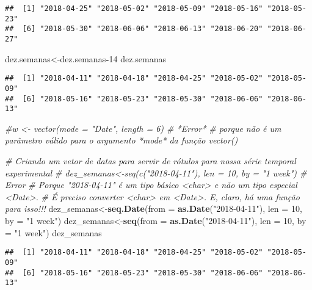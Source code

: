 \documentclass[]{article}
\newenvironment{Shaded}{\begin{snugshade}}{\end{snugshade}}
\newcommand{\KeywordTok}[1]{\textcolor[rgb]{0.13,0.29,0.53}{\textbf{#1}}}
\newcommand{\DataTypeTok}[1]{\textcolor[rgb]{0.13,0.29,0.53}{#1}}
\newcommand{\DecValTok}[1]{\textcolor[rgb]{0.00,0.00,0.81}{#1}}
\newcommand{\StringTok}[1]{\textcolor[rgb]{0.31,0.60,0.02}{#1}}
\newcommand{\CommentTok}[1]{\textcolor[rgb]{0.56,0.35,0.01}{\textit{#1}}}
\newcommand{\OperatorTok}[1]{\textcolor[rgb]{0.81,0.36,0.00}{\textbf{#1}}}
\newcommand{\NormalTok}[1]{#1}
\begin{document}
\begin{verbatim}
##  [1] "2018-04-25" "2018-05-02" "2018-05-09" "2018-05-16" "2018-05-23"
##  [6] "2018-05-30" "2018-06-06" "2018-06-13" "2018-06-20" "2018-06-27"
\end{verbatim}

\begin{Shaded}
\begin{Highlighting}[]
\NormalTok{dez.semanas<-dez.semanas}\OperatorTok{-}\DecValTok{14}
\NormalTok{dez.semanas}
\end{Highlighting}
\end{Shaded}

\begin{verbatim}
##  [1] "2018-04-11" "2018-04-18" "2018-04-25" "2018-05-02" "2018-05-09"
##  [6] "2018-05-16" "2018-05-23" "2018-05-30" "2018-06-06" "2018-06-13"
\end{verbatim}

\begin{Shaded}
\begin{Highlighting}[]
\CommentTok{#w <- vector(mode = "Date", length = 6) # *Error*}
\CommentTok{# porque não é um parâmetro válido para o argumento *mode* da função vector()}

\CommentTok{# Criando um vetor de datas para servir de rótulos para nossa série temporal experimental}
\CommentTok{# dez_semanas<-seq(c("2018-04-11"), len = 10, by = "1 week") # Error}
\CommentTok{# Porque "2018-04-11" é um tipo básico <char> e não um tipo especial <Date>.}
\CommentTok{# É preciso converter <char> em <Date>. E, claro, há uma função para isso!!!}
\NormalTok{dez_semanas<-}\KeywordTok{seq.Date}\NormalTok{(}\DataTypeTok{from =} \KeywordTok{as.Date}\NormalTok{(}\StringTok{"2018-04-11"}\NormalTok{), }\DataTypeTok{len =} \DecValTok{10}\NormalTok{, }\DataTypeTok{by =} \StringTok{"1 week"}\NormalTok{)}
\NormalTok{dez_semanas<-}\KeywordTok{seq}\NormalTok{(}\DataTypeTok{from =} \KeywordTok{as.Date}\NormalTok{(}\StringTok{"2018-04-11"}\NormalTok{), }\DataTypeTok{len =} \DecValTok{10}\NormalTok{, }\DataTypeTok{by =} \StringTok{"1 week"}\NormalTok{)}
\NormalTok{dez_semanas}
\end{Highlighting}
\end{Shaded}

\begin{verbatim}
##  [1] "2018-04-11" "2018-04-18" "2018-04-25" "2018-05-02" "2018-05-09"
##  [6] "2018-05-16" "2018-05-23" "2018-05-30" "2018-06-06" "2018-06-13"
\end{verbatim}
\end{document}
